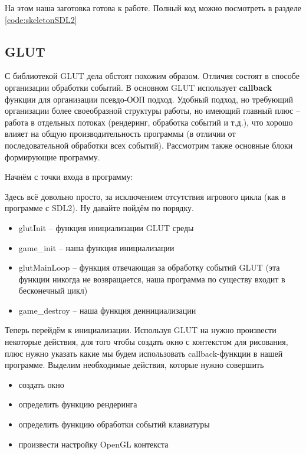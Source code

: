 На этом наша заготовка готова к работе. Полный код можно посмотреть в разделе \ref{code:skeletonSDL2}

\subsection{GLUT}
С библиотекой GLUT дела обстоят похожим образом. Отличия состоят в способе организации обработки событий.
В основном GLUT использует \textbf{callback} функции для организации псевдо-ООП подход. Удобный подход, но 
требующий организации более своеобразной структуры работы, но имеющий главный плюс -- работа в отдельных 
потоках (рендеринг, обработка событий и т.д.), что хорошо влияет на общую производительность программы 
(в отличии от последовательной обработки всех событий). Рассмотрим также основные блоки формирующие 
программу.

Начнём с точки входа в программу:


Здесь всё довольно просто, за исключением отсутствия игрового цикла (как в программе с SDL2). Ну давайте 
пойдём по порядку.
\begin{itemize}\itemsep-5pt
    \item glutInit -- функция инициализации GLUT среды
    \item game\_init -- наша функция инициализации
    \item glutMainLoop -- функция отвечающая за обработку событий GLUT (эта функции никогда не 
        возвращается, наша программа по существу входит в бесконечный цикл)
    \item game\_destroy -- наша функция деинициализации
\end{itemize}

Теперь перейдём к инициализации. Используя GLUT на нужно произвести некоторые действия, для того чтобы 
создать окно с контекстом для рисования, плюс нужно указать какие мы будем использовать callback-функции 
в нашей программе. Выделим необходимые действия, которые нужно совершить

\newpage

\begin{itemize}\itemsep-5pt
    \item создать окно
    \item определить функцию рендеринга
    \item определить функцию обработки событий клавиатуры
    \item произвести настройку OpenGL контекста
\end{itemize} 

